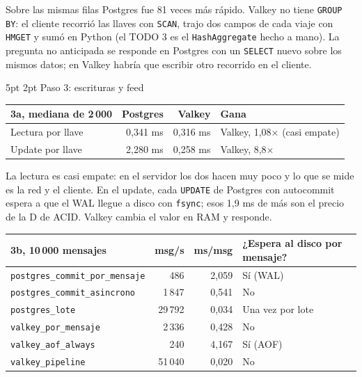 \documentclass[10pt,letterpaper]{article}
\makeatletter
\renewcommand\subsection{\@startsection{subsection}{2}{\z@}%
  {5pt \@plus 1pt}{2pt}%
  {\normalfont\small\bfseries\color{acc}}}
\makeatother
\begin{document}
Sobre las mismas filas Postgres fue 81 veces más rápido. Valkey no tiene \texttt{GROUP BY}: el cliente
recorrió las llaves con \texttt{SCAN}, trajo dos campos de cada viaje con \texttt{HMGET} y sumó en
Python (el TODO 3 es el \texttt{HashAggregate} hecho a mano). La pregunta no anticipada se responde en
Postgres con un \texttt{SELECT} nuevo sobre los mismos datos; en Valkey habría que escribir otro
recorrido en el cliente.

\subsection{Paso 3: escrituras y feed}

\begin{center}\footnotesize
\begin{tabular}{@{}lrrl@{}}
\toprule
\textbf{3a, mediana de 2\,000} & \textbf{Postgres} & \textbf{Valkey} & \textbf{Gana} \\
\midrule
Lectura por llave & 0,341 ms & 0,316 ms & Valkey, 1,08× (casi empate) \\
Update por llave & 2,280 ms & 0,258 ms & Valkey, 8,8× \\
\bottomrule
\end{tabular}
\end{center}

La lectura es casi empate: en el servidor los dos hacen muy poco y lo que se mide es la red y el cliente.
En el update, cada \texttt{UPDATE} de Postgres con autocommit espera a que el WAL llegue a disco con
\texttt{fsync}; esos 1,9 ms de más son el precio de la D de ACID. Valkey cambia el valor en RAM y responde.

\begin{center}\footnotesize
\begin{tabular}{@{}lrrl@{}}
\toprule
\textbf{3b, 10\,000 mensajes} & \textbf{msg/s} & \textbf{ms/msg} & \textbf{¿Espera al disco por mensaje?} \\
\midrule
\texttt{postgres\_commit\_por\_mensaje} & 486 & 2,059 & Sí (WAL) \\
\texttt{postgres\_commit\_asincrono} & 1\,847 & 0,541 & No \\
\texttt{postgres\_lote} & 29\,792 & 0,034 & Una vez por lote \\
\texttt{valkey\_por\_mensaje} & 2\,336 & 0,428 & No \\
\texttt{valkey\_aof\_always} & 240 & 4,167 & Sí (AOF) \\
\texttt{valkey\_pipeline} & 51\,040 & 0,020 & No \\
\bottomrule
\end{tabular}
\end{center}
\end{document}
